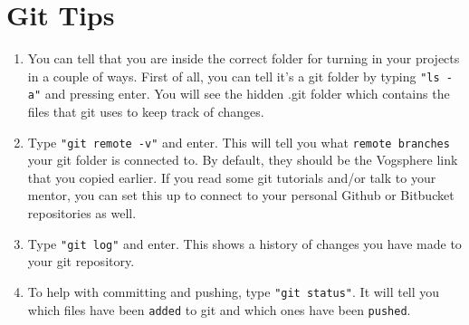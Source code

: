 \documentclass{42-en}
\begin{document}
\chapter{Git Tips}

\begin{enumerate}
	
	\item You can tell that you are inside the correct folder for turning in your projects in a couple of ways. First of all, you can tell it's a git folder by typing \texttt{"ls -a"} and pressing enter. You will see the hidden .git folder which contains the files that git uses to keep track of changes.

	\item Type \texttt{"git remote -v"} and enter. This will tell you what \texttt{remote branches} your git folder is connected to. By default, they should be the Vogsphere link that you copied earlier. If you read some git tutorials and/or talk to your mentor, you can set this up to connect to your personal Github or Bitbucket repositories as well.

	\item Type \texttt{"git log"} and enter. This shows a history of changes you have made to your git repository.

	\item To help with committing and pushing, type \texttt{"git status"}. It will tell you which files have been \texttt{added} to git and which ones have been \texttt{pushed}.

\end{enumerate}

\end{document}
